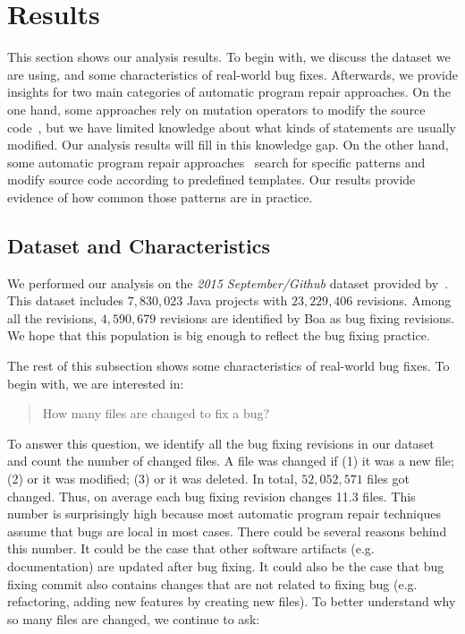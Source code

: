 \documentclass{sig-alternate-05-2015}
\begin{document}
\section{Results}


This section shows our analysis results. To begin with, we discuss the dataset
we are using, and some characteristics of real-world bug fixes. Afterwards, we
provide insights for two main categories of automatic program repair approaches.
On the one hand, some approaches rely on mutation operators to
modify the source code~\cite{legoues2012,weimer2009}, but we have limited knowledge about what kinds of
statements are usually modified. Our analysis results will fill in this
knowledge gap. On the other hand, some automatic program repair approaches~\cite{kim2013} search for specific patterns and modify source code according to
predefined templates. Our results provide evidence of how common those
patterns are in practice.

\subsection{Dataset and Characteristics}

We performed our analysis on the \emph{2015 September/Github} dataset provided by~\cite{dyer2013}. This
dataset includes $7,830,023$ Java projects with $23,229,406$ revisions. Among
all the revisions, $4,590,679$ revisions are identified by Boa as bug fixing
revisions. We hope that this population is big enough to reflect the bug fixing
practice.

The rest of this subsection shows some characteristics of real-world bug fixes.
To begin with, we are interested in:

\begin{quote}
	How many files are changed to fix a bug?
\end{quote}

To answer this question, we identify all the bug fixing revisions in our dataset
and count the number of changed files. A file was changed if (1) it was a new
file; (2) or it was modified; (3) or it was deleted. In total, $52,052,571$
files got changed. Thus, on average each bug fixing revision changes 11.3 files.
This number is surprisingly high because most automatic program repair
techniques assume that bugs are local in most cases. There could be several
reasons behind this number. It could be the case that other software artifacts
(e.g.  documentation) are updated after bug fixing. It could also be the case
that bug fixing commit also contains changes that are not related to fixing bug
(e.g. refactoring, adding new features by creating new files). To better
understand why so many files are changed, we continue to ask:
\end{document}
